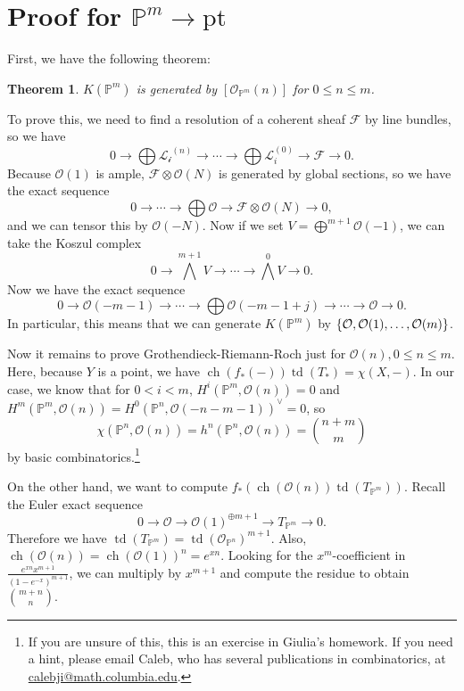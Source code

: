 \documentclass[leqno, openany]{memoir}
\newtheorem{thm}{Theorem}[section]
\theoremstyle{definition}
\theoremstyle{remark}
\theoremstyle{plain}
\theoremstyle{definition}
\theoremstyle{remark}
\renewcommand{\P}{\mathbb{P}}
\newcommand{\mc}[1]{\mathcal{#1}}
\newcommand{\mr}[1]{\mathrm{#1}}
\DeclareMathOperator{\ch}{ch}
\DeclareMathOperator{\td}{td}
\begin{document}
\section{Proof for $\P^m \to \mr{pt}$}%
\label{sec:proof_for_p_m_to_pt_}

First, we have the following theorem:
\begin{thm}
    $K(\P^m)$ is generated by $[\mc{O}_{\P^m}(n)]$ for $0 \leq n \leq m$.
\end{thm}

To prove this, we need to find a resolution of a coherent sheaf $\mc{F}$ by line bundles, so we have
\[ 0 \to \bigoplus \mc{L_i}^{(n)} \to \cdots \to \bigoplus \mc{L}_i^{(0)} \to \mc{F} \to 0. \]
Because $\mc{O}(1)$ is ample, $\mc{F} \otimes \mc{O}(N)$ is generated by global sections, so we have the exact sequence
\[ 0 \to \cdots \to \bigoplus \mc{O} \to \mc{F} \otimes \mc{O}(N) \to 0, \]
and we can tensor this by $\mc{O}(-N)$. Now if we set $V = \bigoplus^{m+1} \mc{O}(-1)$, we can take the Koszul complex
\[ 0 \to {\bigwedge}^{m+1} V \to \cdots \to {\bigwedge}^0 V \to 0. \]
Now we have the exact sequence
\[ 0 \to \mc{O}(-m-1) \to \cdots \to \bigoplus \mc{O}(-m-1+j) \to \cdots \to \mc{O} \to 0. \]
In particular, this means that we can generate $K(\P^m)$ by $\qty{\mc{O}, \mc{O}(1), \ldots, \mc{O}(m)}$.

Now it remains to prove Grothendieck-Riemann-Roch just for $\mc{O}(n), 0 \leq n \leq m$. Here, because $Y$ is a point, we have $\ch(f_*(-)) \td(T_*) = \chi(X, -)$. In our case, we know that for $0 < i < m$, $H^i(\P^m, \mc{O}(n)) = 0$ and $H^m(\P^m, \mc{O}(n)) = {H^0(\P^n, \mc{O}(-n-m-1))}^{\vee} = 0$, so
\[ \chi(\P^n, \mc{O}(n)) = h^n(\P^n, \mc{O}(n)) = \binom{n+m}{m} \]
by basic combinatorics.\footnote{If you are unsure of this, this is an exercise in Giulia's homework. If you need a hint, please email Caleb, who has several publications in combinatorics, at \url{calebji@math.columbia.edu}.}

On the other hand, we want to compute $f_*(\ch(\mc{O}(n)) \td(T_{\P^m}))$. Recall the Euler exact sequence
\[ 0 \to \mc{O} \to {\mc{O}(1)}^{\oplus m+1} \to T_{\P^m} \to 0. \]
Therefore we have $\td(T_{ \P^m }) = { \td(\mc{O}_{\P^n}) }^{m+1}$. Also, $\ch(\mc{O}(n)) = { \ch(\mc{O}(1)) }^n = e^{xn}$. Looking for the $x^m$-coefficient in $\frac{e^{xn} x^{m+1}}{{(1-e^{-x})}^{m+1}}$, we can multiply by $x^{m+1}$ and compute the residue to obtain $\binom{m+n}{n}$.
\end{document}
